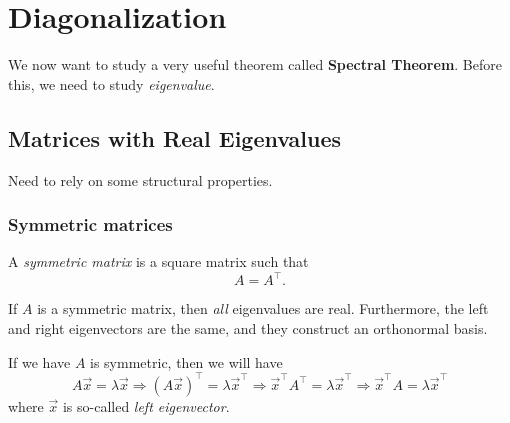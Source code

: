 \chapter{Diagonalization}
We now want to study a very useful theorem called \textbf{Spectral Theorem}. Before this, we need to study \emph{eigenvalue}.
\section{Matrices with Real Eigenvalues}
Need to rely on some structural properties.

\subsection{Symmetric matrices}
\begin{definition}
	A \emph{symmetric matrix} is a square matrix such that
	\[
		A = A^{\top}.
	\]
\end{definition}

\begin{theorem}\label{thm:spectral-theorem}
	If $A$ is a symmetric matrix, then \emph{all} eigenvalues are real. Furthermore, the left and right
	eigenvectors are the same, and they construct an orthonormal basis.
\end{theorem}

\begin{definition}
	If we have $A$ is symmetric, then we will have
	\[
		A \vec{x} = \lambda \vec{x}\Rightarrow
		(A \vec{x})^{\top} = \lambda \vec{x}^{\top}\Rightarrow
		\vec{x}^{\top} A^{\top} = \lambda\vec{x}^{\top}\Rightarrow
		\vec{x}^{\top} A = \lambda\vec{x}^{\top}
	\]
	where $\vec{x}$ is so-called \emph{left eigenvector}.
\end{definition}

